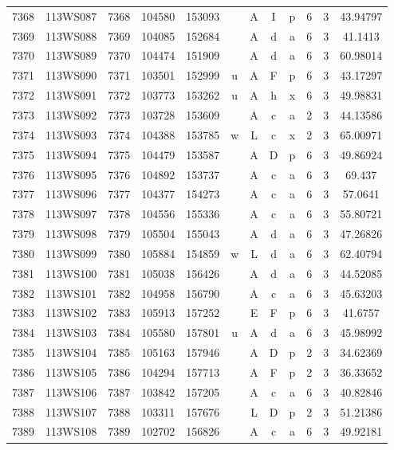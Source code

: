 \begin{tabular}{|*{12}{c|}}
7368 & 113WS087 & 7368 & 104580 & 153093 &  & A & I & p & 6 & 3 & 43.94797 \\ 
7369 & 113WS088 & 7369 & 104085 & 152684 &  & A & d & a & 6 & 3 & 41.1413 \\ 
7370 & 113WS089 & 7370 & 104474 & 151909 &  & A & d & a & 6 & 3 & 60.98014 \\ 
7371 & 113WS090 & 7371 & 103501 & 152999 & u & A & F & p & 6 & 3 & 43.17297 \\ 
7372 & 113WS091 & 7372 & 103773 & 153262 & u & A & h & x & 6 & 3 & 49.98831 \\ 
7373 & 113WS092 & 7373 & 103728 & 153609 &  & A & c & a & 2 & 3 & 44.13586 \\ 
7374 & 113WS093 & 7374 & 104388 & 153785 & w & L & c & x & 2 & 3 & 65.00971 \\ 
7375 & 113WS094 & 7375 & 104479 & 153587 &  & A & D & p & 6 & 3 & 49.86924 \\ 
7376 & 113WS095 & 7376 & 104892 & 153737 &  & A & c & a & 6 & 3 & 69.437 \\ 
7377 & 113WS096 & 7377 & 104377 & 154273 &  & A & c & a & 6 & 3 & 57.0641 \\ 
7378 & 113WS097 & 7378 & 104556 & 155336 &  & A & c & a & 6 & 3 & 55.80721 \\ 
7379 & 113WS098 & 7379 & 105504 & 155043 &  & A & d & a & 6 & 3 & 47.26826 \\ 
7380 & 113WS099 & 7380 & 105884 & 154859 & w & L & d & a & 6 & 3 & 62.40794 \\ 
7381 & 113WS100 & 7381 & 105038 & 156426 &  & A & d & a & 6 & 3 & 44.52085 \\ 
7382 & 113WS101 & 7382 & 104958 & 156790 &  & A & c & a & 6 & 3 & 45.63203 \\ 
7383 & 113WS102 & 7383 & 105913 & 157252 &  & E & F & p & 6 & 3 & 41.6757 \\ 
7384 & 113WS103 & 7384 & 105580 & 157801 & u & A & d & a & 6 & 3 & 45.98992 \\ 
7385 & 113WS104 & 7385 & 105163 & 157946 &  & A & D & p & 2 & 3 & 34.62369 \\ 
7386 & 113WS105 & 7386 & 104294 & 157713 &  & A & F & p & 2 & 3 & 36.33652 \\ 
7387 & 113WS106 & 7387 & 103842 & 157205 &  & A & c & a & 6 & 3 & 40.82846 \\ 
7388 & 113WS107 & 7388 & 103311 & 157676 &  & L & D & p & 2 & 3 & 51.21386 \\ 
7389 & 113WS108 & 7389 & 102702 & 156826 &  & A & c & a & 6 & 3 & 49.92181 \\ 

\end{tabular}
